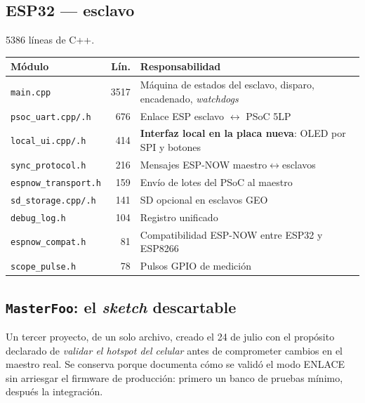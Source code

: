 \subsection{ESP32 --- esclavo}

\num{5386} l\'ineas de C++.

\begin{center}\footnotesize
\begin{tabularx}{\textwidth}{@{}l r X@{}}
\toprule
M\'odulo & L\'in. & Responsabilidad \\
\midrule
\texttt{main.cpp} & 3517 & M\'aquina de estados del esclavo, disparo, encadenado, \emph{watchdogs} \\
\texttt{psoc\_uart.cpp/.h} & 676 & Enlace ESP esclavo $\leftrightarrow$ PSoC 5LP \\
\texttt{local\_ui.cpp/.h} & 414 & \textbf{Interfaz local en la placa nueva}: OLED por SPI y botones \\
\texttt{sync\_protocol.h} & 216 & Mensajes ESP-NOW maestro$\leftrightarrow$esclavos \\
\texttt{espnow\_transport.h} & 159 & Env\'io de lotes del PSoC al maestro \\
\texttt{sd\_storage.cpp/.h} & 141 & SD opcional en esclavos GEO \\
\texttt{debug\_log.h} & 104 & Registro unificado \\
\texttt{espnow\_compat.h} & 81 & Compatibilidad ESP-NOW entre ESP32 y ESP8266 \\
\texttt{scope\_pulse.h} & 78 & Pulsos GPIO de medici\'on \\
\bottomrule
\end{tabularx}
\end{center}


\subsection{\texttt{MasterFoo}: el \emph{sketch} descartable}

Un tercer proyecto, de un solo archivo, creado el 24 de julio con el prop\'osito
declarado de \emph{validar el hotspot del celular} antes de comprometer cambios
en el maestro real. Se conserva porque documenta c\'omo se valid\'o el modo
ENLACE sin arriesgar el firmware de producci\'on: primero un banco de pruebas
m\'inimo, despu\'es la integraci\'on.

